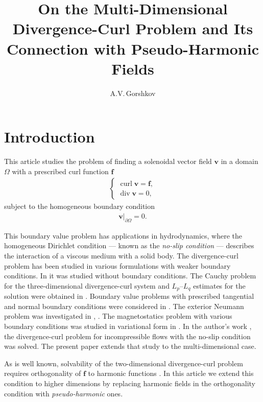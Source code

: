 \documentclass[a4paper]{article}
\title{On the Multi-Dimensional Divergence-Curl Problem and Its Connection with Pseudo-Harmonic Fields}
\author{A.V.\,Gorshkov}
\newcommand{\bff}{\mathbf{f}}
\newcommand{\curl}{\operatorname{curl}}
\newcommand{\divv}{\operatorname{div}}
\newcommand{\bv}{\mathbf{v}}
\begin{document}
\maketitle
{}

\section{Introduction}
This article studies the problem of finding a solenoidal vector field $\bv$ in a domain $\Omega$ with a prescribed curl function $\bff$
\begin{align}\label{mainsyst}
\begin{cases}
\curl \bv = \bff,\\
\divv \bv = 0,
\end{cases}
\end{align}
subject to the homogeneous boundary condition
\begin{align}\label{boundcond}
\bv|_{\partial \Omega} = 0.
\end{align}

This boundary value problem has applications in hydrodynamics, where the homogeneous Dirichlet condition --- known as the {\it no-slip condition} --- describes the interaction of a viscous medium with a solid body. The divergence-curl problem has been studied in various formulations with weaker boundary conditions. In \cite{KirchhartSchulz} it was studied without boundary conditions. The Cauchy problem for the three-dimensional divergence-curl system and $L_p$--$L_q$ estimates for the solution were obtained in \cite{GallayWayne}. Boundary value problems with prescribed tangential and normal boundary conditions were considered in \cite{Divcurl1}. The exterior Neumann problem was investigated in \cite{Divcurl2}, \cite{Divcurl3}. The magnetostatics problem with various boundary conditions was studied in variational form in \cite{BramblePasciak}. In the author's work \cite{G1}, the divergence-curl problem for incompressible flows with the no-slip condition was solved. The present paper extends that study to the multi-dimensional case.

As is well known, solvability of the two-dimensional divergence-curl problem requires orthogonality of $\bff$ to harmonic functions \cite{G1}\cite{Quartapelle2}. In this article we extend this condition to higher dimensions by replacing harmonic fields in the orthogonality condition with {\it pseudo-harmonic} ones.
\end{document}
